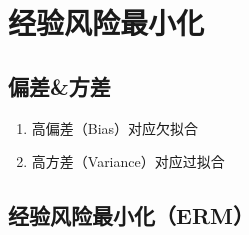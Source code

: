 \section{经验风险最小化}

\subsection{偏差\&方差}
\begin{enumerate}
	\item 高偏差（Bias）对应欠拟合
	\item 高方差（Variance）对应过拟合
\end{enumerate}

\subsection{经验风险最小化（ERM）}
